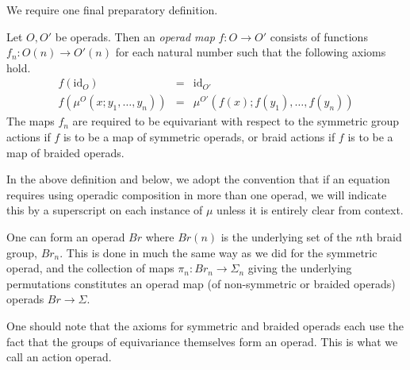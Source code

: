 \documentclass{amsbook} %
\numberwithin{section}{chapter}
\begin{document}
We require one final preparatory definition.

\begin{Defi}
Let $O,O'$ be operads.  Then an \textit{operad map} $f:O \rightarrow O'$ consists of functions $f_{n}:O(n) \rightarrow O'(n)$ for each natural number such that the following axioms hold.
\[
\begin{array}{rcl}
f(\textrm{id}_{O}) & = & \textrm{id}_{O'} \\
f(\mu^{O}(x; y_{1}, \ldots, y_{n})) & = & \mu^{O'}(f(x); f(y_{1}), \ldots, f(y_{n}))
\end{array}
\]
The maps $f_{n}$ are required to be equivariant with respect to the symmetric group actions if $f$ is to be a map of symmetric operads, or braid actions if $f$ is to be a map of braided operads.
\end{Defi}

\begin{conv}
In the above definition and below, we adopt the convention that if an equation requires using operadic composition in more than one operad, we will indicate this by a superscript on each instance of $\mu$ unless it is entirely clear from context.
\end{conv}

\begin{example}
One can form an operad $Br$ where $Br(n)$ is the underlying set of the $n$th braid group, $Br_{n}$.  This is done in much the same way as we did for the symmetric operad, and the collection of maps $\pi_{n}:Br_{n} \rightarrow \Sigma_{n}$ giving the underlying permutations constitutes an operad map (of non-symmetric or braided operads) operads $Br \rightarrow \Sigma$.
\end{example}

One should note that the axioms for symmetric and braided operads each use the fact that the groups of equivariance themselves form an operad.  This is what we call an action operad.
\end{document}
